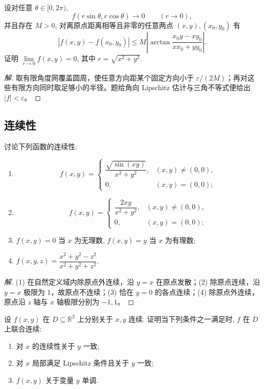 \documentclass[../../数学分析培优讲义(答案版).tex]{subfiles}
\begin{document}
\begin{example}
设对任意 $\theta\in\lbrack0,2\pi)$,
\[
    f(r\sin\theta,r\cos\theta)\to0\qquad(r\to0),
\]
并且存在 $M>0$, 对离原点距离相等且非零的任意两点 $(x,y),(x_0,y_0)$ 有
\[
    |f(x,y)-f(x_0,y_0)|
    \leq M\left|\arctan\dfrac{x_0y-xy_0}{xx_0+yy_0}\right|.
\]
证明 $\displaystyle\lim\limits_{r\to0}f(x,y)=0$, 其中 $r=\sqrt{x^2+y^2}$.
\end{example}

\begin{proof}[解]
取有限角度网覆盖圆周，使任意方向距某个固定方向小于 $\varepsilon/(2M)$；再对这些有限方向同时取足够小的半径。题给角向 Lipschitz 估计与三角不等式便给出 $|f|<\varepsilon$。
\end{proof}

\subsection{连续性}

\begin{example}
讨论下列函数的连续性:
\begin{enumerate}[label=(\arabic*)]
    \item
    \[
        f(x,y)=
        \begin{cases}
            \dfrac{\sqrt{\sin(xy)}}{x^2+y^2}, & (x,y)\ne(0,0),\\
            0, & (x,y)=(0,0);
        \end{cases}
    \]
    \item
    \[
        f(x,y)=
        \begin{cases}
            \dfrac{2xy}{x^2+y^2}, & (x,y)\ne(0,0),\\
            0, & (x,y)=(0,0);
        \end{cases}
    \]
    \item $f(x,y)=0$ 当 $x$ 为无理数, $f(x,y)=y$ 当 $x$ 为有理数;
    \item $\displaystyle f(x,y,z)=\dfrac{x^2+y^2-z^2}{x^2+y^2+z^2}$.
\end{enumerate}
\end{example}

\begin{proof}[解]
(1) 在自然定义域内除原点外连续，沿 $y=x$ 在原点发散；(2) 除原点连续，沿 $y=x$ 极限为 $1$，故原点不连续；(3) 恰在 $y=0$ 的各点连续；(4) 除原点外连续，原点沿 $z$ 轴与 $x$ 轴极限分别为 $-1,1$。
\end{proof}

\begin{example}[\markstar]
设 $f(x,y)$ 在 $D\subseteq\mathbb{R}^2$ 上分别关于 $x,y$ 连续. 证明当下列条件之一满足时, $f$ 在 $D$ 上联合连续:
\begin{enumerate}[label=(\arabic*)]
    \item 对 $x$ 的连续性关于 $y$ 一致;
    \item 对 $x$ 局部满足 Lipschitz 条件且关于 $y$ 一致;
    \item $f(x,y)$ 关于变量 $y$ 单调.
\end{enumerate}
\end{example}
\end{document}
